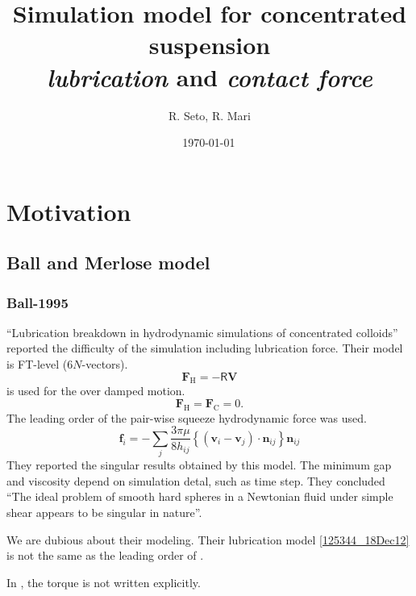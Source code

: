 \documentclass[12pt]{article}
\title{Simulation model for concentrated suspension\\
\emph{lubrication} and \emph{contact force}}
\date{\shortdate\today \, \ampmtime }
\author{R. Seto, R. Mari}
\newcommand{\tens}[1]{\bm{\mathsf{#1}}}
\begin{document}
\maketitle

\section{Motivation}
\subsection*{Ball and Merlose model}

\subsubsection*{Ball-1995}

\citet{Ball_1995} ``Lubrication breakdown in hydrodynamic simulations of concentrated colloids''
reported the difficulty of the simulation including lubrication force.
Their model is FT-level ($6N$-vectors).
\begin{equation}
 \bm{F}_{\mathrm{H}} = - \tens{R} \bm{V}
\end{equation}
is used for the over damped motion.
\begin{equation}
 \bm{F}_{\mathrm{H}} = \bm{F}_{\mathrm{C}} = 0.
\end{equation}
%
The leading order of the pair-wise squeeze hydrodynamic force
was used.
\begin{equation}
 \bm{f}_i = 
- \sum_j \frac{3 \pi \mu}{8 h_{ij}} 
\left\{
(\bm{v}_i - \bm{v}_j)\cdot \bm{n}_{ij}
\right\} \bm{n}_{ij}\label{125344_18Dec12}
\end{equation}
%
They reported the singular results obtained by this model.
%
The minimum gap and viscosity 
depend on simulation detal, such as time step.
%
They concluded
``The ideal problem of smooth hard spheres
in a Newtonian fluid under simple shear appears
to be singular in nature''.
%


We are dubious about their modeling.
%
Their lubrication model \eqref{125344_18Dec12}
is not the same as the leading order of \citet{Jeffrey_1992}.


In \citet{Ball_1995}, 
the torque is not written explicitly.
%
\end{document}
